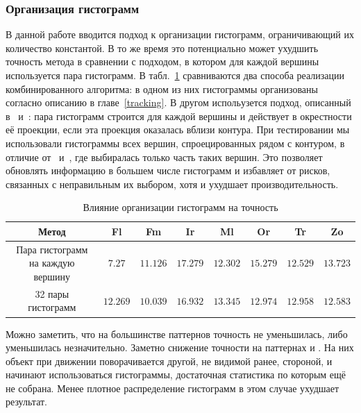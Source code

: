 \subsubsection{Организация гистограмм}

В данной работе вводится подход к организации гистограмм, ограничивающий их
количество константой.
В то же время это потенциально может ухудшить точность метода в сравнении с
подходом, в котором для каждой вершины используется пара гистограмм.
В табл.~\ref{tab:full_hist} сравниваются два способа реализации
комбинированного алгоритма: в одном из них гистограммы организованы согласно
описанию в главе~\ref{tracking}.
В другом испольузется подход, описанный в~\cite{Tjaden2017}
и~\cite{Tjaden2018}: пара гистограмм строится для каждой вершины и действует в
окрестности её проекции, если эта проекция оказалась вблизи контура.
При тестировании мы использовали гистограммы всех вершин, спроецированных рядом
с контуром, в отличие от~\cite{Tjaden2017} и~\cite{Tjaden2018}, где выбиралась
только часть таких вершин.
Это позволяет обновлять информацию в большем числе гистограмм и избавляет от
рисков, связанных с неправильным их выбором, хотя и ухудшает
производительность.

\begin{table}[h]
\caption{\label{tab:full_hist}Влияние организации гистограмм на точность}
\begin{center}
\begin{tabular}{|c|c|c|c|c|c|c|c|}
\hline
Метод & Fl & Fm & Ir & Ml & Or & Tr & Zo \\
\hline
Пара гистограмм на каждую вершину & $7.27$ & $\mathbf{11.126}$ &
$\mathbf{17.279}$ & $12.302$ & $\mathbf{15.279}$ & $12.529$ &
$\mathbf{13.723}$\\
\hline
32 пары гистограмм & $\mathbf{12.269}$ & $10.039$ & $16.932$ &
$\mathbf{13.345}$ & $12.974$ &
$\mathbf{12.958}$ & $12.583$ \\
\hline
\end{tabular}
\end{center}
\end{table}

Можно заметить, что на большинстве паттернов  точность не уменьшилась, либо
уменьшилась незначительно.
Заметно снижение точности на паттернах  и .
На них объект при движении поворачивается другой, не видимой ранее, стороной, и
начинают использоваться гистограммы, достаточная статистика по которым ещё не
собрана.
Менее плотное распределение гистограмм в этом случае ухудшает результат.


